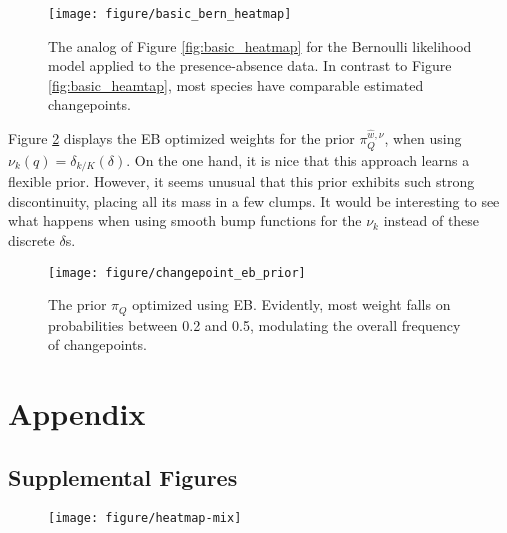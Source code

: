 \documentclass[14pt]{extreport}
\begin{document}
\begin{figure}
  \centering
  \texttt{[image: figure/basic\_bern\_heatmap]}
  \caption{
    The analog of Figure \ref{fig:basic_heatmap} for the Bernoulli likelihood
    model applied to the presence-absence data. In contrast to Figure
    \ref{fig:basic_heamtap}, most species have comparable estimated
    changepoints.
    \label{fig:basic_bern_heatmap}
  }
\end{figure}

Figure \ref{fig:changepoint_eb_prior} displays the EB optimized weights for the
prior $\pi_{Q}^{\hat{w}, \nu}$, when using $\nu_{k}\left(q\right) = \delta_{k /
  K}\left(\delta\right)$. On the one hand, it is nice that this approach
learns a flexible prior. However, it seems unusual that this prior exhibits such
strong discontinuity, placing all its mass in a few clumps. It would be
interesting to see what happens when using smooth bump functions for the $\nu_k$
instead of these discrete $\delta$s.

\begin{figure}
  \centering
  \texttt{[image: figure/changepoint\_eb\_prior]}
  \caption{The prior $\pi_{Q}$ optimized using EB. Evidently, most weight falls
    on probabilities between 0.2 and 0.5, modulating the overall frequency of
    changepoints.
    \label{fig:changepoint_eb_prior} }
\end{figure}






\section{Appendix}
\label{sec:appendix}

\subsection{Supplemental Figures}
\label{subsec:supplemental_figures}

\begin{figure}
  \centering
  \texttt{[image: figure/heatmap-mix]}
  \caption{\label{fig:heatmap-mix} }
\end{figure}
\end{document}
